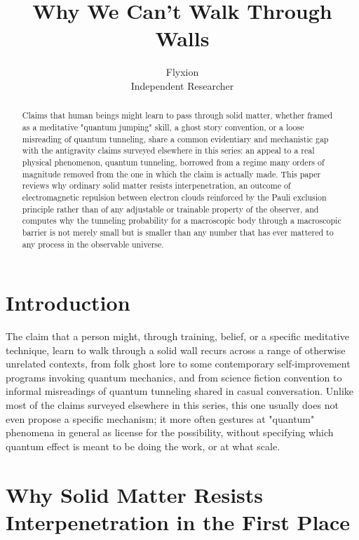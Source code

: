 \documentclass[11pt]{article}
\title{Why We Can't Walk Through Walls}
\author{Flyxion \\ \small Independent Researcher}
\date{}
\begin{document}
\maketitle

\begin{abstract}
Claims that human beings might learn to pass through solid matter, whether framed as a meditative "quantum jumping" skill, a ghost story convention, or a loose misreading of quantum tunneling, share a common evidentiary and mechanistic gap with the antigravity claims surveyed elsewhere in this series: an appeal to a real physical phenomenon, quantum tunneling, borrowed from a regime many orders of magnitude removed from the one in which the claim is actually made. This paper reviews why ordinary solid matter resists interpenetration, an outcome of electromagnetic repulsion between electron clouds reinforced by the Pauli exclusion principle rather than of any adjustable or trainable property of the observer, and computes why the tunneling probability for a macroscopic body through a macroscopic barrier is not merely small but is smaller than any number that has ever mattered to any process in the observable universe.
\end{abstract}

\section{Introduction}

The claim that a person might, through training, belief, or a specific meditative technique, learn to walk through a solid wall recurs across a range of otherwise unrelated contexts, from folk ghost lore to some contemporary self-improvement programs invoking quantum mechanics, and from science fiction convention to informal misreadings of quantum tunneling shared in casual conversation. Unlike most of the claims surveyed elsewhere in this series, this one usually does not even propose a specific mechanism; it more often gestures at "quantum" phenomena in general as license for the possibility, without specifying which quantum effect is meant to be doing the work, or at what scale.

\section{Why Solid Matter Resists Interpenetration in the First Place}
\end{document}
